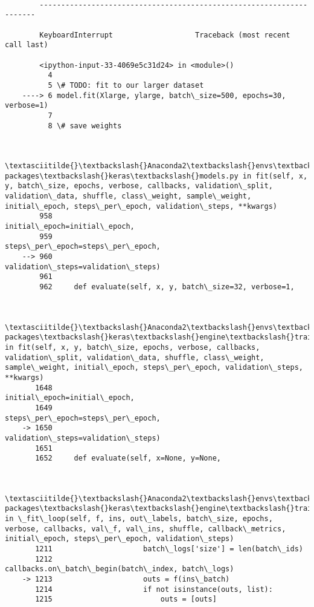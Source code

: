 \documentclass[11pt]{article}
\begin{document}
    \begin{Verbatim}[commandchars=\\\{\}]

        ---------------------------------------------------------------------

        KeyboardInterrupt                   Traceback (most recent call last)

        <ipython-input-33-4069e5c31d24> in <module>()
          4 
          5 \# TODO: fit to our larger dataset
    ----> 6 model.fit(Xlarge, ylarge, batch\_size=500, epochs=30, verbose=1)
          7 
          8 \# save weights
    

        \textasciitilde{}\textbackslash{}Anaconda2\textbackslash{}envs\textbackslash{}tensorflow\textbackslash{}lib\textbackslash{}site-packages\textbackslash{}keras\textbackslash{}models.py in fit(self, x, y, batch\_size, epochs, verbose, callbacks, validation\_split, validation\_data, shuffle, class\_weight, sample\_weight, initial\_epoch, steps\_per\_epoch, validation\_steps, **kwargs)
        958                               initial\_epoch=initial\_epoch,
        959                               steps\_per\_epoch=steps\_per\_epoch,
    --> 960                               validation\_steps=validation\_steps)
        961 
        962     def evaluate(self, x, y, batch\_size=32, verbose=1,
    

        \textasciitilde{}\textbackslash{}Anaconda2\textbackslash{}envs\textbackslash{}tensorflow\textbackslash{}lib\textbackslash{}site-packages\textbackslash{}keras\textbackslash{}engine\textbackslash{}training.py in fit(self, x, y, batch\_size, epochs, verbose, callbacks, validation\_split, validation\_data, shuffle, class\_weight, sample\_weight, initial\_epoch, steps\_per\_epoch, validation\_steps, **kwargs)
       1648                               initial\_epoch=initial\_epoch,
       1649                               steps\_per\_epoch=steps\_per\_epoch,
    -> 1650                               validation\_steps=validation\_steps)
       1651 
       1652     def evaluate(self, x=None, y=None,
    

        \textasciitilde{}\textbackslash{}Anaconda2\textbackslash{}envs\textbackslash{}tensorflow\textbackslash{}lib\textbackslash{}site-packages\textbackslash{}keras\textbackslash{}engine\textbackslash{}training.py in \_fit\_loop(self, f, ins, out\_labels, batch\_size, epochs, verbose, callbacks, val\_f, val\_ins, shuffle, callback\_metrics, initial\_epoch, steps\_per\_epoch, validation\_steps)
       1211                     batch\_logs['size'] = len(batch\_ids)
       1212                     callbacks.on\_batch\_begin(batch\_index, batch\_logs)
    -> 1213                     outs = f(ins\_batch)
       1214                     if not isinstance(outs, list):
       1215                         outs = [outs]
    


\end{Verbatim}
\end{document}
